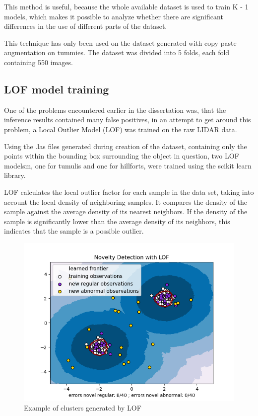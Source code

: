 This method is useful, because the whole available dataset is used to train K - 1 models, which makes it possible to analyze whether there are significant differences in the use of different parts of the dataset.

This technique has only been used on the dataset generated with copy paste augmentation on tummies. The dataset was divided into 5 folds, each fold containing 550 images.

\subsection{LOF model training}
One of the problems encountered earlier in the dissertation was, that the inference results contained many false positives, in an attempt to get around this problem, a Local Outlier Model (LOF) was trained on the raw LIDAR data.

Using the .las files generated during creation of the dataset, containing only the points within the bounding box surrounding the object in question, two LOF modelsm, one for tumulis and one for hillforts, were trained using the scikit learn library\cite{lof}.

LOF calculates the local outlier factor for each sample in the data set, taking into account the local density of neighboring samples. It compares the density of the sample against the average density of its nearest neighbors. If the density of the sample is significantly lower than the average density of its neighbors, this indicates that the sample is a possible outlier.

\begin{figure}[H]
\centering
\includegraphics[]{images/lof_example.png}
\caption{Example of clusters generated by LOF}
\end{figure}

